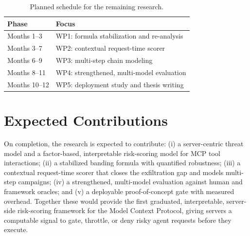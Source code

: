 \begin{table}[H]
    \centering
    \caption{Planned schedule for the remaining research.}
    \label{tab:timeline}
    \begin{tabular}{l l}
        \hline
        \textbf{Phase} & \textbf{Focus} \\
        \hline
        Months 1--3   & WP1: formula stabilization and re-analysis \\
        Months 3--7   & WP2: contextual request-time scorer \\
        Months 6--9   & WP3: multi-step chain modeling \\
        Months 8--11  & WP4: strengthened, multi-model evaluation \\
        Months 10--12 & WP5: deployment study and thesis writing \\
        \hline
    \end{tabular}
\end{table}

\section{Expected Contributions}
\label{sec:plan:contributions}

On completion, the research is expected to contribute: (i) a server-centric
threat model and a factor-based, interpretable risk-scoring model for MCP tool
interactions; (ii) a stabilized banding formula with quantified robustness; (iii)
a contextual request-time scorer that closes the exfiltration gap and models
multi-step campaigns; (iv) a strengthened, multi-model evaluation against human
and framework oracles; and (v) a deployable proof-of-concept gate with measured
overhead. Together these would provide the first graduated, interpretable,
server-side risk-scoring framework for the Model Context Protocol, giving servers
a computable signal to gate, throttle, or deny risky agent requests before they
execute.
